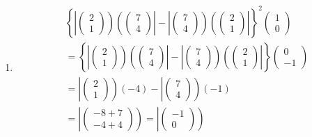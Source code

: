 \documentclass[aps,preprint]{revtex4}
\begin{document}
\begin{enumerate}
\item 
\begin{align}
& \left\{ \left\vert \left( 
\begin{array}{c}
2 \\ 
1%
\end{array}%
\right) \right) \left( \left( 
\begin{array}{c}
7 \\ 
4%
\end{array}%
\right) \right\vert -\left\vert \left( 
\begin{array}{c}
7 \\ 
4%
\end{array}%
\right) \right) \left( \left( 
\begin{array}{c}
2 \\ 
1%
\end{array}%
\right) \right\vert \right\} ^{2}\left( 
\begin{array}{c}
1 \\ 
0%
\end{array}%
\right) \\
& =\left\{ \left\vert \left( 
\begin{array}{c}
2 \\ 
1%
\end{array}%
\right) \right) \left( \left( 
\begin{array}{c}
7 \\ 
4%
\end{array}%
\right) \right\vert -\left\vert \left( 
\begin{array}{c}
7 \\ 
4%
\end{array}%
\right) \right) \left( \left( 
\begin{array}{c}
2 \\ 
1%
\end{array}%
\right) \right\vert \right\} \left( 
\begin{array}{c}
0 \\ 
-1%
\end{array}%
\right) \\
& =\left\vert \left( 
\begin{array}{c}
2 \\ 
1%
\end{array}%
\right) \right) \left( -4\right) -\left\vert \left( 
\begin{array}{c}
7 \\ 
4%
\end{array}%
\right) \right) \left( -1\right) \\
& =\left\vert \left( 
\begin{array}{c}
-8+7 \\ 
-4+4%
\end{array}%
\right) \right) =\left\vert \left( 
\begin{array}{c}
-1 \\ 
0%
\end{array}%
\right) \right)
\end{align}


\end{enumerate}
\end{document}
